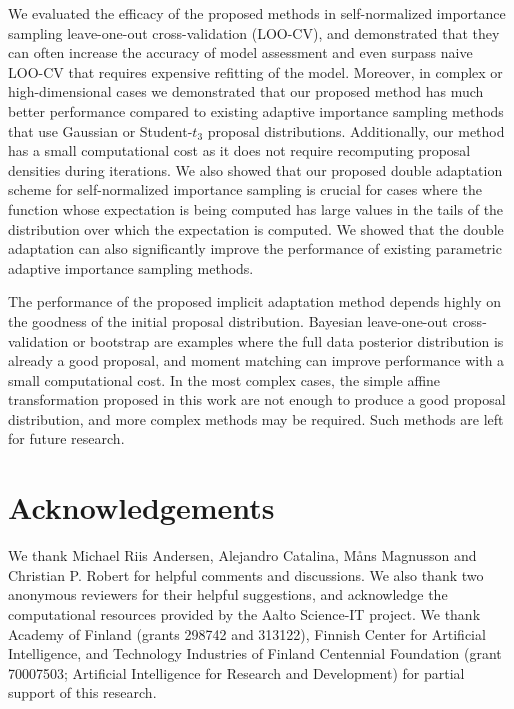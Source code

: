 \documentclass[12pt]{article}
\begin{document}
We evaluated the efficacy of the proposed methods in self-normalized importance sampling leave-one-out
cross-validation (LOO-CV), and demonstrated that they can often increase the accuracy
of model assessment and even surpass naive LOO-CV that requires expensive
refitting of the model.
Moreover, in complex or high-dimensional cases we demonstrated that our proposed method has much better performance
compared to existing adaptive importance sampling methods that use
Gaussian or Student-$t_3$ proposal distributions.
Additionally, our method has a small computational cost as it does not require
recomputing proposal densities during iterations.
%
%
%
%
%
%
%
%
%
We also showed that our proposed double adaptation scheme
for self-normalized importance sampling is crucial
for cases where the function whose expectation is being computed has large values
in the tails of the distribution over which the expectation is computed.
We showed that the double adaptation can also significantly improve the performance of
existing parametric adaptive importance sampling methods.


The performance of the proposed implicit adaptation method depends highly
on the goodness of the initial proposal distribution. Bayesian leave-one-out cross-validation or
bootstrap are examples where the full data posterior distribution is
already a good proposal, and moment matching can improve performance
with a small computational cost. In the most complex cases, the simple affine transformation
proposed in this work are not enough to produce a good proposal distribution, and
more complex methods may be required.
Such methods are left for future research.








\section{Acknowledgements}

We thank Michael Riis Andersen, Alejandro Catalina, M{\aa}ns Magnusson and Christian P. Robert for helpful comments and discussions.
We also thank two anonymous reviewers for their helpful suggestions, and
acknowledge the computational resources provided by the Aalto Science-IT project.
We thank Academy of Finland (grants 298742 and 313122),
Finnish Center for Artificial Intelligence,
and Technology Industries of Finland Centennial Foundation (grant 70007503; Artificial Intelligence for Research and Development)
for partial support of this research.
\end{document}
